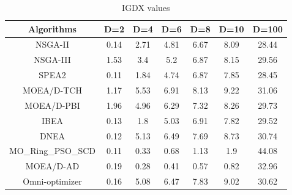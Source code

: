 \documentclass[conference]{IEEEtran}
\begin{document}
\begin{table}[htbp]
\centering
\caption{IGDX values}
\begin{tabular}{@{}ccccccc@{}}
\toprule
Algorithms      & D=2                          & D=4                          & D=6                          & D=8                          & D=10                         & D=100                         \\ \midrule
NSGA-II         & 0.14                         & 2.71                         & 4.81                         & 6.67                         & 8.09                         & 28.44                         \\
NSGA-III        & 1.53                         & 3.4                          & 5.2                          & 6.87                         & 8.15                         & 29.56                         \\
SPEA2           & \cellcolor[HTML]{F8FF00}0.11 & 1.84                         & 4.74                         & 6.87                         & 7.85                         & \cellcolor[HTML]{F8FF00}28.45 \\
MOEA/D-TCH      & 1.17                         & 5.53                         & 6.91                         & 8.13                         & 9.22                          & 31.06                         \\
MOEA/D-PBI      & 1.96                         & 4.96                         & 6.29                         & 7.32                         & 8.26                         & 29.73                         \\
IBEA            & 0.13                         & 1.8                          & 5.03                         & 6.91                         & 7.82                         & 29.52                         \\
DNEA            & 0.12                         & 5.13                         & 6.49                         & 7.69                         & 8.73                         & 30.74                         \\
MO\_Ring\_PSO\_SCD & \cellcolor[HTML]{F8FF00}0.11 & 0.33                         & 0.68                         & 1.13                         & 1.9                          & 44.08                         \\
MOEA/D-AD       & 0.19                         & \cellcolor[HTML]{F8FF00}0.28 & \cellcolor[HTML]{F8FF00}0.41 & \cellcolor[HTML]{F8FF00}0.57 & \cellcolor[HTML]{F8FF00}0.82 & 32.96                         \\
Omni-optimizer  & 0.16                         & 5.08                         & 6.47                         & 7.83                         & 9.02                         & 30.62                         \\ \bottomrule
\end{tabular}
\label{table: IGDX sumup}
\end{table}
\end{document}
